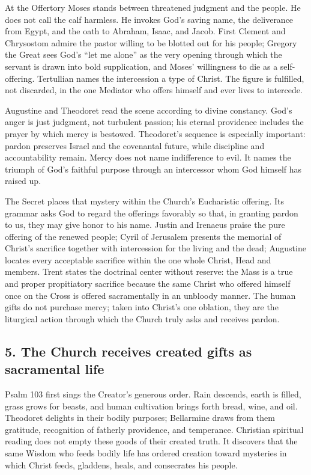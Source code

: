 At the Offertory Moses stands between threatened judgment and the people. He
does not call the calf harmless. He invokes God's saving name, the deliverance
from Egypt, and the oath to Abraham, Isaac, and Jacob. First Clement and
Chrysostom admire the pastor willing to be blotted out for his people; Gregory
the Great sees God's ``let me alone'' as the very opening through which the
servant is drawn into bold supplication, and Moses' willingness to die as a
self-offering. Tertullian names the intercession a type of Christ. The figure
is fulfilled, not discarded, in the one Mediator who offers himself and ever
lives to intercede.

Augustine and Theodoret read the scene according to divine constancy. God's
anger is just judgment, not turbulent passion; his eternal providence includes
the prayer by which mercy is bestowed. Theodoret's sequence is especially
important: pardon preserves Israel and the covenantal future, while discipline
and accountability remain. Mercy does not name indifference to evil. It names
the triumph of God's faithful purpose through an intercessor whom God himself
has raised up.

The Secret places that mystery within the Church's Eucharistic offering. Its
grammar asks God to regard the offerings favorably so that, in granting pardon
to us, they may give honor to his name. Justin and Irenaeus praise the pure
offering of the renewed people; Cyril of Jerusalem presents the memorial of
Christ's sacrifice together with intercession for the living and the dead;
Augustine locates every acceptable sacrifice within the one whole Christ,
Head and members. Trent states the doctrinal center without reserve: the Mass
is a true and proper propitiatory sacrifice because the same Christ who offered
himself once on the Cross is offered sacramentally in an unbloody manner. The
human gifts do not purchase mercy; taken into Christ's one oblation, they are
the liturgical action through which the Church truly asks and receives pardon.

\subsection*{5. The Church receives created gifts as sacramental life }

Psalm 103 first sings the Creator's generous order. Rain descends, earth is
filled, grass grows for beasts, and human cultivation brings forth bread,
wine, and oil. Theodoret delights in their bodily purposes; Bellarmine draws
from them gratitude, recognition of fatherly providence, and temperance. Christian spiritual reading
does not empty these goods of their created truth. It discovers that the same
Wisdom who feeds bodily life has ordered creation toward mysteries in which
Christ feeds, gladdens, heals, and consecrates his people.

